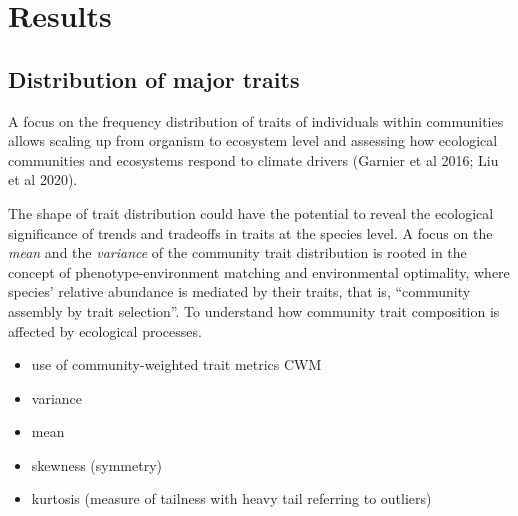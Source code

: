 \documentclass[
]{book}
\providecommand{\tightlist}{%
  \setlength{\itemsep}{0pt}\setlength{\parskip}{0pt}}
\begin{document}
\hypertarget{results}{%
\chapter{Results}\label{results}}

\hypertarget{distribution-of-major-traits}{%
\section{Distribution of major traits}\label{distribution-of-major-traits}}

A focus on the frequency distribution of traits of individuals within communities allows scaling up from organism to ecosystem level and assessing how ecological communities and ecosystems respond to climate drivers (Garnier et al 2016; Liu et al 2020).

The shape of trait distribution could have the potential to reveal the ecological significance of trends and tradeoffs in traits at the species level. A focus on the \emph{mean } and the \emph{variance} of the community trait distribution is rooted in the
concept of phenotype-environment matching and environmental optimality, where species' relative abundance is mediated by their traits, that is, ``community assembly by trait selection''. To understand how community trait composition is affected by ecological processes.

\begin{itemize}
\tightlist
\item
  use of community-weighted trait metrics CWM
\item
  variance
\item
  mean
\item
  skewness (symmetry)
\item
  kurtosis (measure of tailness with heavy tail referring to outliers)
\end{itemize}
\end{document}
